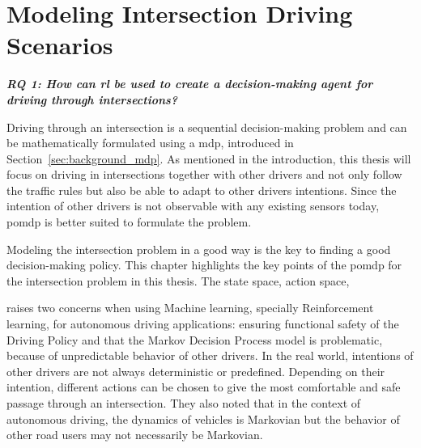 \newcommand {\matr}[2]{\left[\begin{array}{#1}#2\end{array}\right]}
\newcommand{\E}{\mathbb{E}}
\newcommand{\tr}{\mathrm{tr}}
\newcommand{\x}{{\mathbf{x}}}
\renewcommand{\u}{{\mathbf{u}}}
\newcommand{\w}{{\mathbf{w}}}
\renewcommand{\r}{{\mathbf{r}}}

\chapter{Modeling Intersection Driving Scenarios}
\label{ch:modeling_intersection}
\begin{center}
  \textit{\textbf{RQ 1: How can \gls{rl} be used to create a decision-making agent for driving through intersections?}}
\end{center}
  \vspace{12pt}
  
Driving through an intersection is a sequential decision-making problem and can be mathematically formulated using a \gls{mdp}, introduced in Section~\ref{sec:background_mdp}. As mentioned in the introduction, this thesis will focus on driving in intersections together with other drivers and not only follow the traffic rules but also be able to adapt to other drivers intentions. Since the intention of other drivers is not observable with any existing sensors today, \gls{pomdp} is better suited to formulate the problem. 

Modeling the intersection problem in a good way is the key to finding a good decision-making policy. This chapter highlights the key points of the \gls{pomdp} for the intersection problem in this thesis. The state space, action space, 
 


 raises two concerns when using Machine learning, specially Reinforcement learning, for autonomous driving applications: ensuring functional safety of the Driving Policy and that the Markov Decision Process model is problematic, because of unpredictable behavior of other drivers.
In the real world, intentions of other drivers are not always deterministic or predefined. Depending on their intention, different actions can be chosen to give the most comfortable and safe passage through an intersection.
They also noted that in the context of autonomous driving, the dynamics of vehicles is Markovian but the behavior of other road users may not necessarily be Markovian.

